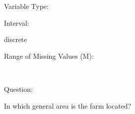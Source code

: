 \documentclass[
]{article}
\begin{document}
\begin{minipage}[t]{0.3\linewidth}

Variable Type:

\end{minipage}%
\begin{minipage}[t]{0.7\linewidth}

\end{minipage}

\begin{minipage}[t]{0.3\linewidth}

Interval:

\end{minipage}%
\begin{minipage}[t]{0.7\linewidth}

discrete

\end{minipage}

\begin{minipage}[t]{0.3\linewidth}

Range of Missing Values (M):

\end{minipage}%
\begin{minipage}[t]{0.7\linewidth}

~

\end{minipage}

\begin{minipage}[t]{0.3\linewidth}

Question:

\end{minipage}%
\begin{minipage}[t]{0.7\linewidth}

In which general area is the farm located?

\end{minipage}
\end{document}
